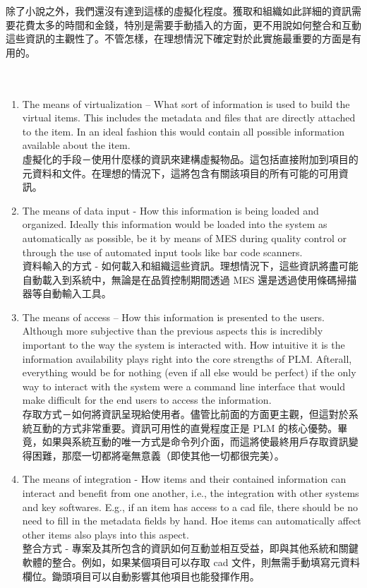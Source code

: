 \fontsize{14pt}{5pt}\sectionef
 {除了小說之外，我們還沒有達到這樣的虛擬化程度。獲取和組織如此詳細的資訊需要花費太多的時間和金錢，特別是需要手動插入的方面，更不用說如何整合和互動這些資訊的主觀性了。不管怎樣，在理想情況下確定對於此實施最重要的方面是有用的。}\\[15pt]

\fontsize{12}{2.5pt}\selectfont {Those are:}\\[1pt]
\fontsize{12}{2.5pt}\selectfont {那些是：}\\[15pt]

\begin{enumerate}[{\hspace{0.5em}\textbullet}]
\fontsize{12}{2.5pt}\selectfont
\item The means of virtualization – What sort of information is used to build the virtual items. This includes the metadata and files that are directly attached to the item. In an ideal fashion this would contain all possible information available about the item.\\
虛擬化的手段－使用什麼樣的資訊來建構虛擬物品。這包括直接附加到項目的元資料和文件。在理想的情況下，這將包含有關該項目的所有可能的可用資訊。
\item The means of data input - How this information is being loaded and organized. Ideally this information would be loaded into the system as automatically as possible, be it by means of MES during quality control or through the use of automated input tools like bar code scanners.\\
資料輸入的方式 - 如何載入和組織這些資訊。理想情況下，這些資訊將盡可能自動載入到系統中，無論是在品質控制期間透過 MES 還是透過使用條碼掃描器等自動輸入工具。
\item The means of access – How this information is presented to the users. Although more subjective than the previous aspects this is incredibly important to the way the system is interacted with. How intuitive it is the information availability plays right into the core strengths of PLM. Afterall, everything would be for nothing (even if all else would be perfect) if the only way to interact with the system were a command line interface that would make difficult for the end users to access the information.\\
存取方式－如何將資訊呈現給使用者。儘管比前面的方面更主觀，但這對於系統互動的方式非常重要。資訊可用性的直覺程度正是 PLM 的核心優勢。畢竟，如果與系統互動的唯一方式是命令列介面，而這將使最終用戶存取資訊變得困難，那麼一切都將毫無意義（即使其他一切都很完美）。
\item The means of integration - How items and their contained information can interact and benefit from one another, i.e., the integration with other systems and key softwares. E.g., if an item has access to a cad file, there should be no need to fill in the metadata fields by hand. Hoe items can automatically affect other items also plays into this aspect.\\
整合方式 - 專案及其所包含的資訊如何互動並相互受益，即與其他系統和關鍵軟體的整合。例如，如果某個項目可以存取 cad 文件，則無需手動填寫元資料欄位。鋤頭項目可以自動影響其他項目也能發揮作用。

\end{enumerate}
\renewcommand{\baselinestretch}{0.5} %